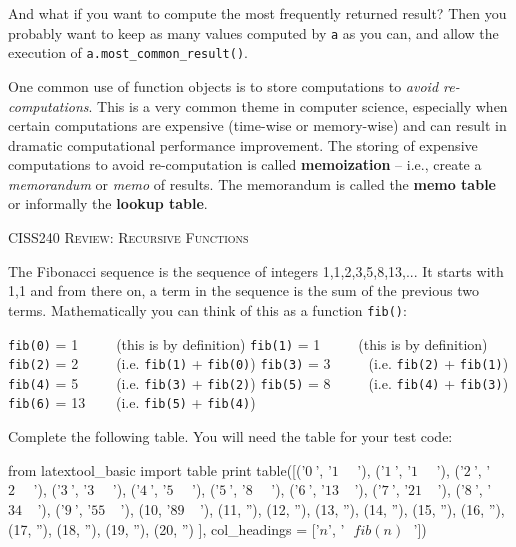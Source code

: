 And what if you want to compute the most frequently returned result?
Then you probably want to keep as many values computed by \verb!a!
as you can, and allow the execution of \verb!a.most_common_result()!.

One common use of function objects is to store computations
to \textit{avoid re-computations}.
This is a very common theme in computer science, especially
when certain computations are expensive (time-wise or memory-wise)
and can result in dramatic computational performance improvement.
The storing of expensive computations to avoid re-computation
is called \textbf{memoization} -- i.e., create a 
\textit{memorandum} or \textit{memo} of
results.
The memorandum is called the \textbf{memo table}
or informally the \textbf{lookup table}.

\newpage
\textsc{CISS240 Review: Recursive Functions}

The Fibonacci sequence is the sequence of integers 1,1,2,3,5,8,13,...
It starts with 1,1
and from there on, a term in the sequence is the sum of the previous two terms.
Mathematically you can think of this as a function \verb!fib()!:

\begin{tightlist}
  \li \verb!fib(0)! = 1 \verb!    ! (this is by definition)
  \li \verb!fib(1)! = 1 \verb!    ! (this is by definition)
  \li \verb!fib(2)! = 2 \verb!    ! (i.e. \verb!fib(1)! + \verb!fib(0)!)
  \li \verb!fib(3)! = 3 \verb!    ! (i.e. \verb!fib(2)! + \verb!fib(1)!)
  \li \verb!fib(4)! = 5 \verb!    ! (i.e. \verb!fib(3)! + \verb!fib(2)!)
  \li \verb!fib(5)! = 8 \verb!    ! (i.e. \verb!fib(4)! + \verb!fib(3)!)
  \li \verb!fib(6)! = 13 \verb!   ! (i.e. \verb!fib(5)! + \verb!fib(4)!)
\end{tightlist}

Complete the following table. You will need the table for your test code:

\begin{python}
from latextool_basic import table
print table([('$0\ $', '$1\ \ \ \ \ \ $'),
             ('$1\ $', '$1\ \ \ \ \ \ $'),
             ('$2\ $', '$2\ \ \ \ \ \ $'),
             ('$3\ $', '$3\ \ \ \ \ \ $'),
             ('$4\ $', '$5\ \ \ \ \ \ $'),
             ('$5\ $', '$8\ \ \ \ \ \ $'),
             ('$6\ $', '$13\ \ \ \ \ $'),
             ('$7\ $', '$21\ \ \ \ \ $'),
             ('$8\ $', '$34\ \ \ \ \ $'),
             ('$9\ $', '$55\ \ \ \ \ $'),
             (10, '$89\ \ \ \ \ $'),
             (11, ''),
             (12, ''),
             (13, ''),
             (14, ''),
             (15, ''),
             (16, ''),
             (17, ''),
             (18, ''),
             (19, ''),
             (20, '')
            ],
            col_headings = ['$n$', '$\ \ \ fib(n)\ \ \ $'])
\end{python}




